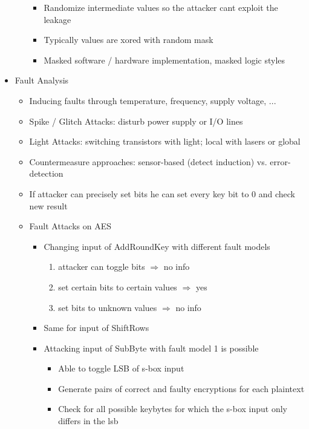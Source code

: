 \documentclass[11pt, paper=a4, twocolumn]{scrartcl}
\begin{document}
\begin{itemize}
\begin{itemize}
						\begin{itemize}
							\item Randomize intermediate values so the attacker cant exploit the leakage
							\item Typically values are xored with random mask
							\item Masked software / hardware implementation, masked logic styles
						\end{itemize}
				\end{itemize}
			\item Fault Analysis
				\begin{itemize}
					\item Inducing faults through temperature, frequency, supply voltage, ...
					\item Spike / Glitch Attacks: disturb power supply or I/O lines
					\item Light Attacks: switching transistors with light; local with lasers or global
					\item Countermeasure approaches: sensor-based (detect induction) vs. error-detection 
					\item If attacker can precisely set bits he can set every key bit to 0 and check new result
					\item Fault Attacks on AES
						\begin{itemize}
							\item Changing input of AddRoundKey with different fault models
								\begin{enumerate}
									\item attacker can toggle bits $\Rightarrow$ no info
									\item set certain bits to certain values $\Rightarrow$ yes
									\item set bits to unknown values $\Rightarrow$ no info
								\end{enumerate}
							\item Same for input of ShiftRows
							\item Attacking input of SubByte with fault model 1 is possible
								\begin{itemize}
									\item Able to toggle LSB of s-box input
									\item Generate pairs of correct and faulty encryptions for each plaintext
									\item Check for all possible keybytes for which the s-box input only differs 
										in the lsb
								\end{itemize}
						\end{itemize}
				\end{itemize}
		\end{itemize}
\end{document}
